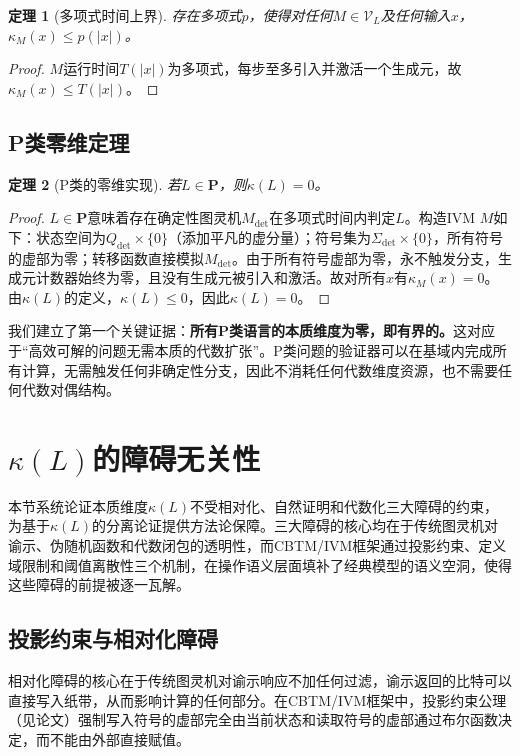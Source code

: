 \documentclass{ctexart}
\newtheorem{theorem}{定理}[section]
\newtheorem{proof}[theorem]{证明}
\begin{document}
	\begin{theorem}[多项式时间上界]\label{thm:poly-bound}
		存在多项式$p$，使得对任何$M\in\mathcal{V}_L$及任何输入$x$，$\kappa_M(x)\le p(|x|)$。
	\end{theorem}
	\begin{proof}
		$M$运行时间$T(|x|)$为多项式，每步至多引入并激活一个生成元，故$\kappa_M(x)\le T(|x|)$。
	\end{proof}
	
	\subsection{P类零维定理}
	
	\begin{theorem}[P类的零维实现]\label{thm:p-zero}
		若$L\in\mathbf{P}$，则$\kappa(L)=0$。
	\end{theorem}
	\begin{proof}
		$L\in\mathbf{P}$意味着存在确定性图灵机$M_{\det}$在多项式时间内判定$L$。构造IVM $M$如下：状态空间为$Q_{\det}\times\{0\}$（添加平凡的虚分量）；符号集为$\Sigma_{\det}\times\{0\}$，所有符号的虚部为零；转移函数直接模拟$M_{\det}$。由于所有符号虚部为零，永不触发分支，生成元计数器始终为零，且没有生成元被引入和激活。故对所有$x$有$\kappa_M(x)=0$。由$\kappa(L)$的定义，$\kappa(L)\le 0$，因此$\kappa(L)=0$。
	\end{proof}
	
	我们建立了第一个关键证据：\textbf{所有$\mathbf{P}$类语言的本质维度为零，即有界的。}这对应于``高效可解的问题无需本质的代数扩张''。P类问题的验证器可以在基域内完成所有计算，无需触发任何非确定性分支，因此不消耗任何代数维度资源，也不需要任何代数对偶结构。
	
	\section{$\kappa(L)$的障碍无关性}
	
	本节系统论证本质维度$\kappa(L)$不受相对化、自然证明和代数化三大障碍的约束，为基于$\kappa(L)$的分离论证提供方法论保障。三大障碍的核心均在于传统图灵机对谕示、伪随机函数和代数闭包的透明性，而CBTM/IVM框架通过投影约束、定义域限制和阈值离散性三个机制，在操作语义层面填补了经典模型的语义空洞，使得这些障碍的前提被逐一瓦解。
	
	\subsection{投影约束与相对化障碍}
	
	相对化障碍的核心在于传统图灵机对谕示响应不加任何过滤，谕示返回的比特可以直接写入纸带，从而影响计算的任何部分。在CBTM/IVM框架中，投影约束公理（见论文\cite{models2026}）强制写入符号的虚部完全由当前状态和读取符号的虚部通过布尔函数决定，而不能由外部直接赋值。
	
\end{document}
